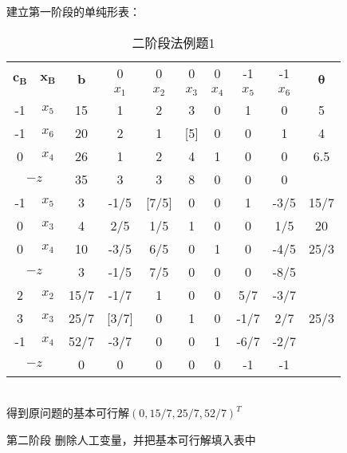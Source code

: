 \documentclass{book}
\begin{document}
建立第一阶段的单纯形表：
\begin{table}[h]
    \centering
        \begin{tabular}{c|c|c|cccccc|c}
            \hline
             \multirow{2}{*}{$\boldsymbol{c_B}$}& \multirow{2}{*}{$\boldsymbol{x_B}$} & \multirow{2}{*}{$\boldsymbol{b}$} & 0 & 0 & 0 & 0 & -1 & -1 & \multirow{2}{*}{$\boldsymbol{\theta}$} \\
             \cline{4-9}
             &&& $x_1$ & $x_2$ & $x_3$ & $x_4$ & $x_5$ & $x_6$ &\\
             \hline
             -1 & $x_5$ & 15 & 1 & 2 & 3 & 0 & 1 & 0 & 5\\
             -1 & $x_6$ & 20 & 2 & 1 & [5] & 0 & 0 & 1 & 4\\
             0 & $x_4$ & 26 & 1 & 2 & 4 & 1 & 0 & 0 & 6.5\\
             \hline
             \multicolumn{2}{c|}{$-z$}  & 35 & 3 & 3 & 8 & 0 & 0 & 0 &\\
             \hline
             -1 & $x_5$ & 3 & -1/5 & [7/5] & 0 & 0 & 1 & -3/5 & 15/7\\
             0 & $x_3$ & 4 & 2/5 & 1/5 & 1 & 0 & 0 & 1/5 & 20\\
             0 & $x_4$ & 10 & -3/5 & 6/5 & 0 & 1 & 0 & -4/5 & 25/3\\
             \hline
             \multicolumn{2}{c|}{$-z$}  & 3 & -1/5 & 7/5 & 0 & 0 & 0 & -8/5 &\\
             \hline
             2 & $x_2$ & 15/7 & -1/7 & 1 & 0 & 0 & 5/7 & -3/7 & \\
             3 & $x_3$ & 25/7 & [3/7] & 0 & 1 & 0 & -1/7 & 2/7 & 25/3\\
             -1 & $x_4$ & 52/7 & -3/7 & 0 & 0 & 1 & -6/7 & -2/7 & \\
             \hline
             \multicolumn{2}{c|}{$-z$}  & 0 & 0 & 0 & 0 & 0 & -1 & -1 &\\
             \hline
        \end{tabular}
        \caption{二阶段法例题1}
        \label{tab:example de two-phase method1}
\end{table}
\\
    得到原问题的基本可行解$(0,15/7,25/7,52/7)^T$

第二阶段 删除人工变量，并把基本可行解填入表中
\end{document}
